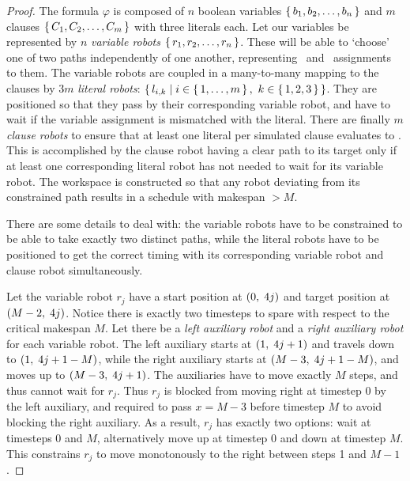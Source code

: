 \begin{proof}
	The formula \(\varphi\) is composed of \(n\) boolean variables \(\set{b_1, b_2, \dots, b_n}\) and \(m\) clauses \(\set{C_1, C_2, \dots, C_m}\) with three literals each. 
	Let our variables be represented by \(n\) \emph{variable robots} \(\set{r_1, r_2, \dots, r_n}\). 
	These will be able to `choose' one of two paths independently of one another, representing \true\ and \false\ assignments to them. 
	The variable robots are coupled in a many-to-many mapping to the clauses by \(3m\) \emph{literal robots}: \(\set{l_{i,k} \mid i \in \set{1, \dots, m},\ k \in \set{1, 2, 3}}\). 
	They are positioned so that they pass by their corresponding variable robot, and have to wait if the variable assignment is mismatched with the literal. 
	There are finally \(m\) \emph{clause robots} to ensure that at least one literal per simulated clause evaluates to \true. 
	This is accomplished by the clause robot having a clear path to its target only if at least one corresponding literal robot has not needed to wait for its variable robot. 
	The workspace is constructed so that any robot deviating from its constrained path results in a schedule with makespan \(> M\).


	There are some details to deal with: the variable robots have to be constrained to be able to take exactly two distinct paths, while the literal robots have to be positioned to get the correct timing with its corresponding variable robot and clause robot simultaneously.

	Let the variable robot \(r_j\) have a start position at \((0, \; 4j)\) and target position at \((M - 2, \; 4j)\). 
	Notice there is exactly two timesteps to spare with respect to the critical makespan \(M\). 
	Let there be a \emph{left auxiliary robot} and a \emph{right auxiliary robot} for each variable robot. 
	The left auxiliary starts at \((1, \; 4j + 1)\) and travels down to \((1, \; 4j + 1 - M)\), while the right auxiliary starts at \((M - 3, \; 4j + 1 - M)\), and moves up to \((M - 3, \; 4j + 1)\). 
	The auxiliaries have to move exactly \(M\) steps, and thus cannot wait for \(r_j\). 
	Thus \(r_j\) is blocked from moving right at timestep 0 by the left auxiliary, and required to pass \(x = M - 3\) before timestep \(M\) to avoid blocking the right auxiliary. 
	As a result, \(r_j\) has exactly two options: wait at timesteps \(0\) and \(M\), alternatively move up at timestep \(0\) and down at timestep \(M\). 
	This constrains \(r_j\) to move monotonously to the right between steps 1 and \(M - 1\).


\end{proof}
